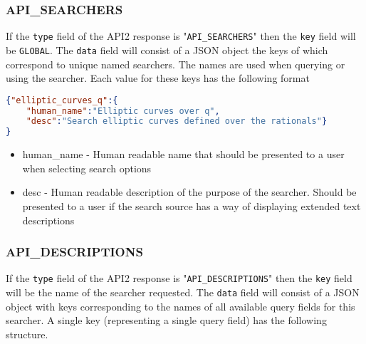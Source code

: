 \documentclass[11pt]{article}
\begin{document}
\subsubsection{API\_SEARCHERS}
If the \texttt{type} field of the API2 response is "\texttt{API\_SEARCHERS}" then the \texttt{key} field will be \texttt{GLOBAL}. The \texttt{data} field will consist of a JSON object the keys of which correspond to unique named searchers. The names are used when querying or using the searcher. Each value for these keys has the following format

\begin{lstlisting}[language=json,firstnumber=1]
{"elliptic_curves_q":{
	"human_name":"Elliptic curves over q",
	"desc":"Search elliptic curves defined over the rationals"}
}
\end{lstlisting}
\begin{itemize}
\item human\_name - Human readable name that should be presented to a user when selecting search options
\item desc - Human readable description of the purpose of the searcher. Should be presented to a user if the search source has a way of displaying extended text descriptions
\end{itemize}

\subsubsection{API\_DESCRIPTIONS}
If the \texttt{type} field of the API2 response is "\texttt{API\_DESCRIPTIONS}" then the \texttt{key} field will be the name of the searcher requested. The \texttt{data} field will consist of a JSON object with keys corresponding to the names of all available query fields for this searcher. A single key (representing a single query field) has the following structure.
\end{document}
